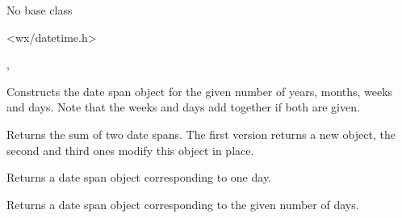 
No base class


<wx/datetime.h>


,\rtfsp
{}



\label{wxdatespanwxdatespan}


Constructs the date span object for the given number of years, months, weeks
and days. Note that the weeks and days add together if both are given.

\label{wxdatespanadd}




Returns the sum of two date spans. The first version returns a new object, the
second and third ones modify this object in place.

\label{wxdatespanday}


Returns a date span object corresponding to one day.



\label{wxdatespandays}


Returns a date span object corresponding to the given number of days.



\label{wxdatespangetdays}

